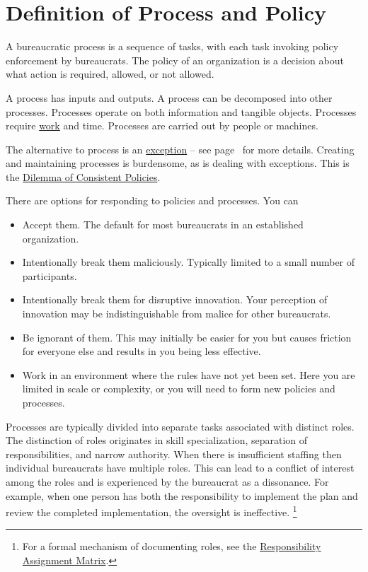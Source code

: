 \section{Definition of Process and Policy\label{sec:definition-of-process}}

A bureaucratic \gls{process} is a sequence of tasks, with each task invoking policy enforcement by bureaucrats. 
The \gls{policy} of an organization is a decision about what action is required, allowed, or not allowed.


A process has inputs and outputs. 
A process can be decomposed into other processes. 
Processes operate on both information and tangible objects. 
Processes require \href{https://en.wikipedia.org/wiki/Work_(physics)}{work} and time. 
Processes are carried out by people or machines.


The alternative to process is an \hyperref[sec:exceptions-to-process]{exception} -- see 
 page~\pageref{sec:exceptions-to-process} 
 for more details. 
Creating and maintaining processes is burdensome, as is dealing with exceptions. This is the \hyperref[table:policy-consistency-across-cases]{Dilemma of Consistent Policies}.


There are options for responding to policies and processes. You can
\begin{itemize}
    \item Accept them. The default for most bureaucrats in an established organization.
    \item Intentionally break them maliciously. Typically limited to a small number of participants. 
    \item Intentionally break them for disruptive innovation. Your perception of innovation may be indistinguishable from malice for other bureaucrats. 
    \item Be ignorant of them. This may initially be easier for you but causes friction for everyone else and results in you being less effective.
    \item Work in an environment where the rules have not yet been set. Here you are limited in scale or complexity, or you will need to form new policies and processes.
\end{itemize}

Processes are typically divided into separate tasks associated with distinct roles. The distinction of roles originates in skill specialization, separation of responsibilities, and narrow authority. 
When there is insufficient staffing then individual bureaucrats have multiple roles. This can lead to a conflict of interest among the roles and is experienced by the bureaucrat as a dissonance. For example, when one person has both the responsibility to implement the plan and review the completed implementation, the oversight is ineffective. \footnote{For a formal mechanism of documenting roles, see the 
\href{https://en.wikipedia.org/wiki/Responsibility_assignment_matrix}{Responsibility Assignment Matrix}.
}


